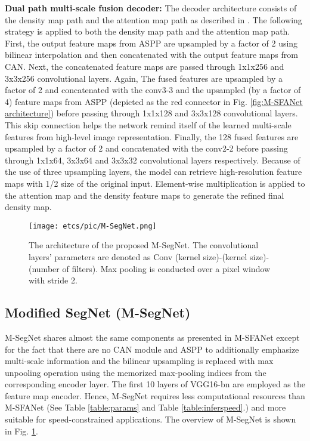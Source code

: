 \documentclass[10pt, conference, a4paper]{IEEEtran}
\begin{document}
\textbf{Dual path multi-scale fusion decoder:} The decoder architecture consists of the density map path and the attention map path as described in \cite{zhu2019dual}. The following strategy is applied to both the density map path and the attention map path. First, the output feature maps from ASPP are upsampled by a factor of 2 using bilinear interpolation and then concatenated with the output feature maps from CAN. Next, the concatenated feature maps are passed through 1x1x256 and 3x3x256 convolutional layers. Again, The fused features are upsampled by a factor of 2 and concatenated with the conv3-3 and the upsampled (by a factor of 4) feature maps from ASPP (depicted as the red connector in Fig. \ref{fig:M-SFANet architecture}) before passing through 1x1x128 and 3x3x128 convolutional layers. This skip connection helps the network remind itself of the learned multi-scale features from high-level image representation. Finally, the 128 fused features are upsampled by a factor of 2 and concatenated with the conv2-2 before passing through 1x1x64, 3x3x64 and 3x3x32 convolutional layers respectively. Because of the use of three upsampling layers, the model can retrieve high-resolution feature maps with 1/2 size of the original input. Element-wise multiplication is applied to the attention map and the density feature maps to generate the refined final density map.
\label{M_SFANet_info}

\begin{figure}
    \centering
    \texttt{[image: etcs/pic/M-SegNet.png]}
    \caption{The architecture of the proposed M-SegNet. The convolutional layers' parameters are denoted as Conv (kernel size)-(kernel size)-(number of filters). Max pooling is conducted over a  pixel window with stride 2.}
    \label{fig:M-SegNet architecture}
\end{figure}

\subsection{Modified SegNet (M-SegNet)}
M-SegNet shares almost the same components as presented in M-SFANet except for the fact that there are no CAN module and ASPP to additionally emphasize multi-scale information and the bilinear upsampling is replaced with max unpooling operation using the memorized max-pooling indices \cite{badrinarayanan2017segnet} from the corresponding encoder layer. The first 10 layers of VGG16-bn are employed as the feature map encoder. Hence, M-SegNet requires less computational resources than M-SFANet (See Table \ref{table:params} and Table \ref{table:inferspeed}.) and more suitable for speed-constrained applications. The overview of M-SegNet is shown in Fig. \ref{fig:M-SegNet architecture}.
\end{document}
